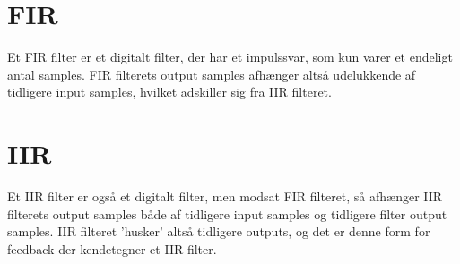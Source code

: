 \section{FIR}
Et FIR filter er et digitalt filter, der har et impulssvar, som kun varer et endeligt antal samples. FIR filterets output samples afhænger altså udelukkende af tidligere input samples, hvilket adskiller sig fra IIR filteret.

\section{IIR}
Et IIR filter er også et digitalt filter, men modsat FIR filteret, så afhænger IIR filterets output samples både af tidligere input samples og tidligere filter output samples. IIR filteret 'husker' altså tidligere outputs, og det er denne form for feedback der kendetegner et IIR filter.